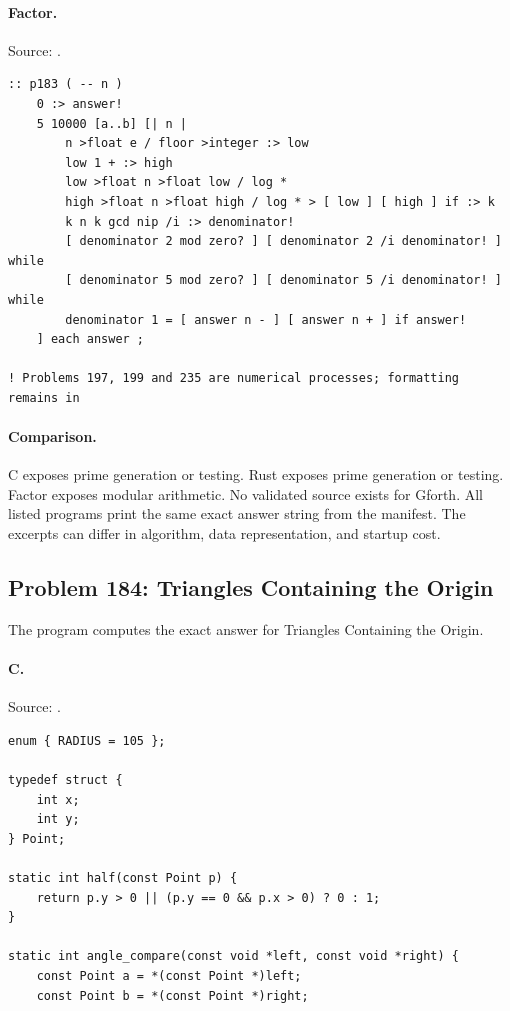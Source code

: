 \paragraph{Factor.} Source: .
\begin{lstlisting}
:: p183 ( -- n )
    0 :> answer!
    5 10000 [a..b] [| n |
        n >float e / floor >integer :> low
        low 1 + :> high
        low >float n >float low / log *
        high >float n >float high / log * > [ low ] [ high ] if :> k
        k n k gcd nip /i :> denominator!
        [ denominator 2 mod zero? ] [ denominator 2 /i denominator! ] while
        [ denominator 5 mod zero? ] [ denominator 5 /i denominator! ] while
        denominator 1 = [ answer n - ] [ answer n + ] if answer!
    ] each answer ;

! Problems 197, 199 and 235 are numerical processes; formatting remains in
\end{lstlisting}

\paragraph{Comparison.}
C exposes prime generation or testing. Rust exposes prime generation or testing. Factor exposes modular arithmetic.
No validated source exists for Gforth.
All listed programs print the same exact answer string from the manifest. The excerpts can differ in algorithm, data representation, and startup cost.

\subsection{Problem 184: Triangles Containing the Origin}
\label{walkthrough:p184}
The program computes the exact answer for Triangles Containing the Origin.

\paragraph{C.} Source: .
\begin{lstlisting}
enum { RADIUS = 105 };

typedef struct {
    int x;
    int y;
} Point;

static int half(const Point p) {
    return p.y > 0 || (p.y == 0 && p.x > 0) ? 0 : 1;
}

static int angle_compare(const void *left, const void *right) {
    const Point a = *(const Point *)left;
    const Point b = *(const Point *)right;
\end{lstlisting}

